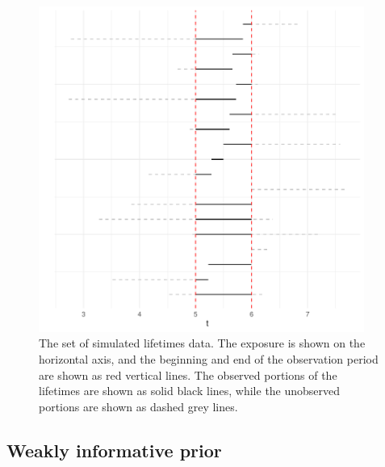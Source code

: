 \begin{figure}[tbp]
    \centering
    \includegraphics[width=0.95\textwidth]{./figures/ch-2/sim-data.pdf}
    \caption{The set of simulated lifetimes data. The exposure is shown on the horizontal axis, and the beginning and end of the observation period are shown as red vertical lines. The observed portions of the lifetimes are shown as solid black lines, while the unobserved portions are shown as dashed grey lines.}
    \label{fig:sim_censored_units}
\end{figure}



\subsection{Weakly informative prior} \label{subsec:weibull-model-fits}

